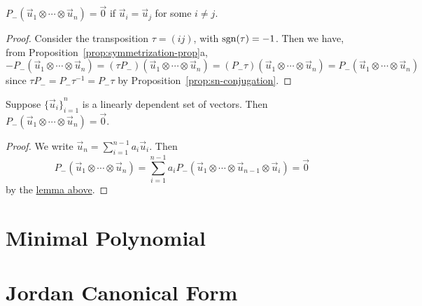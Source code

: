 \begin{lemma}\label{lem:antisym-same-zero}
    \(P_-(\vec{u}_1 \otimes \cdots \otimes \vec{u}_n) = \vec{0}\)
    if \(\vec{u}_i = \vec{u}_j\) for some \(i \neq j\).
\end{lemma}
\begin{proof}
    Consider the transposition \(\tau = (ij)\), with \(\operatorname{sgn}(\tau) = -1\).
    Then we have, from Proposition~\ref{prop:symmetrization-prop}a,
    \begin{equation*}
        -P_-(\vec{u}_1 \otimes \cdots \otimes \vec{u}_n)
        = (\tau P_-)(\vec{u}_1 \otimes \cdots \otimes \vec{u}_n)
        = (P_- \tau)(\vec{u}_1 \otimes \cdots \otimes \vec{u}_n)
        = P_- (\vec{u}_1 \otimes \cdots \otimes \vec{u}_n)
    \end{equation*}
    since \(\tau P_- = P_- \tau^{-1} = P_- \tau\) by Proposition~\ref{prop:sn-conjugation}.
\end{proof}
\begin{theorem}
    Suppose \({\{\vec{u}_i\}}_{i=1}^n\) is a linearly dependent set of vectors.
    Then \(P_-(\vec{u}_1 \otimes \cdots \otimes \vec{u}_n) = \vec{0}\).
\end{theorem}
\begin{proof}
    We write \(\vec{u}_n = \sum_{i=1}^{n-1} a_i\vec{u}_i\).
    Then
    \begin{equation*}
        P_-(\vec{u}_1 \otimes \cdots \otimes \vec{u}_n)
        = \sum_{i=1}^{n-1} a_i P_-(\vec{u}_1 \otimes \cdots \otimes \vec{u}_{n-1} \otimes \vec{u}_i)
        = \vec{0}
    \end{equation*}
    by the \hyperref[lem:antisym-same-zero]{lemma above}.
\end{proof}


\section{Minimal Polynomial}


\section{Jordan Canonical Form}
